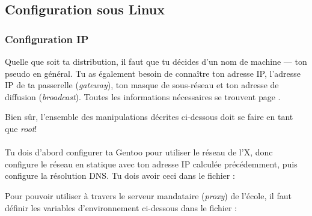 




\subsection{Configuration sous Linux}

\subsubsection{Configuration IP}
Quelle que soit ta distribution, il faut que tu décides d'un nom de
machine --- ton pseudo en général. Tu as également besoin de
conna\^itre ton adresse IP, l'adresse IP de ta passerelle (\emph{gateway}), ton masque de sous-réseau et ton adresse de diffusion (\emph{broadcast}).
Toutes les informations nécessaires se trouvent page
\pageref{calcul_ip}.

Bien sûr, l'ensemble des manipulations décrites ci-dessous doit se faire en tant que \emph{root}!


\paragraph{}
Tu dois d'abord configurer ta Gentoo pour utiliser le réseau de l'X, donc configure le réseau en statique avec ton adresse IP calculée précédemment, puis
configure la résolution DNS. Tu dois avoir ceci dans le fichier  :
\noindent {}

\label{gentoo_mirror} Pour pouvoir utiliser  à travers le serveur mandataire (\emph{proxy}) de l'école, il faut définir les variables d'environnement
ci-dessous dans le fichier  :

